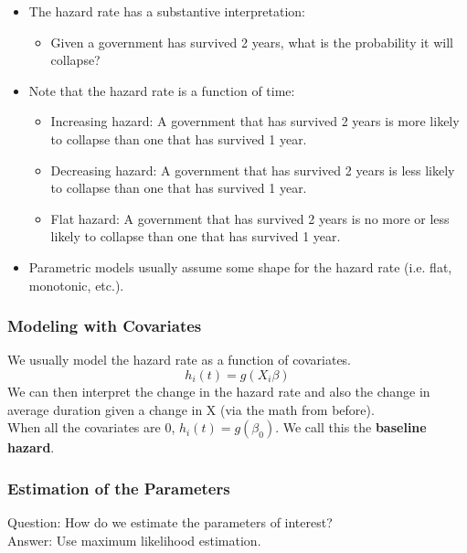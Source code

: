 \documentclass[handout]{beamer}
\begin{document}
\begin{frame}
\begin{itemize}
\item The hazard rate has a substantive interpretation:
\pause
\begin{itemize}
\item Given a government has survived 2 years, what is the probability it will collapse?
\end{itemize}
\pause
\item Note that the hazard rate is a function of time:
\pause
\begin{itemize}
\item Increasing hazard: A government that has survived 2 years is
more likely to collapse than one that has survived 1 year.
\pause
\item Decreasing hazard: A government that has survived 2 years is
less likely to collapse than one that has survived 1 year.
\pause
\item Flat hazard: A government that has survived 2 years is no more
or less likely to collapse than one that has survived 1 year.
\end{itemize}
\pause
\item Parametric models usually assume some shape for the hazard
rate (i.e. flat, monotonic, etc.). 
\end{itemize}
\end{frame}

\begin{frame}
\frametitle{Modeling with Covariates}
\pause
We usually model the hazard rate as a function of covariates.
\pause
\begin{equation*}
h_i(t) = g(X_i \beta)
\end{equation*}
\pause
We can then interpret the change in the hazard rate and also the
change in average duration given a change in X (via the math from before).\\
\pause
\bigskip
When all the covariates are 0, $h_i(t) = g(\beta_0)$.  We call this the
\textbf{baseline hazard}. 
\end{frame}

\begin{frame}
\frametitle{Estimation of the Parameters}
Question: How do we estimate the parameters of interest?\\
\pause
\bigskip 
Answer: Use maximum likelihood estimation.
\end{frame}
\end{document}
